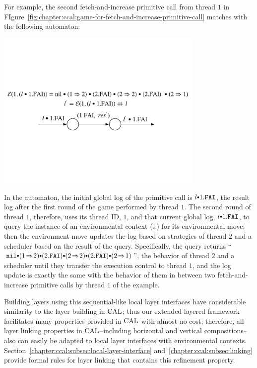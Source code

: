 For example, the second fetch-and-increase primitive call from thread $1$ in FIgure~\ref{fig:chapter:ccal:game-for-fetch-and-increase-primitive-call}
matches with the following automaton:
\begin{center}
\includegraphics[width=0.75\textwidth]{figs/ccal/faiexamplewithcontext}
\end{center}
In the automaton, the initial global log of the primitive call is $l \cons 1.\incticket$,
the result log after the first round of the game performed by thread $1$.
The second round of thread $1$, therefore, uses its thread ID, $1$,  and that current global log, $l \cons 1.\incticket$, to query the instance of an environmental context (${\varepsilon}$) for its environmental move; then the environment move updates the log based on strategies of  thread $2$ and a scheduler based on the result of the query.
Specifically, the query returns ``$\nulllist \cons (1 \switch 2) \cons (2.\incticket) \cons (2 \switch 2) \cons (2.\incticket) \cons (2 \switch 1)$'',
the behavior of  thread $2$ and a scheduler until they transfer the execution control to  thread $1$,  and 
the log update is exactly the same with the behavior of them in between two fetch-and-increase primitive calls by thread $1$ of the example.

Building layers using this sequential-like local layer interfaces have considerable similarity to 
the layer building in $\mathrm{CAL}$; thus 
our extended layered framework facilitates
many properties provided in $\mathrm{CAL}$ with almost no cost;
therefore, all layer linking properties in $\mathrm{CAL}$--including horizontal and vertical compositions--also can 
easily be adapted to local layer interfaces with  environmental contexts.
Section~\ref{chapter:ccal:subsec:local-layer-interface}  and~\ref{chapter:ccal:subsec:linking} provide formal rules for layer linking that contains this refinement property.

